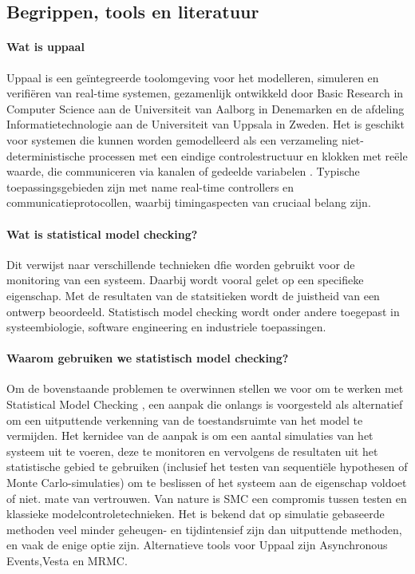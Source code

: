 \documentclass{article}
\begin{document}
	
	\subsection{Begrippen, tools en literatuur}
	
	\paragraph{Wat is uppaal}
	Uppaal is een geïntegreerde toolomgeving voor het modelleren, simuleren en verifiëren van real-time systemen, gezamenlijk ontwikkeld door Basic Research in Computer Science aan de Universiteit van Aalborg in Denemarken en de afdeling Informatietechnologie aan de Universiteit van Uppsala in Zweden. Het is geschikt voor systemen die kunnen worden gemodelleerd als een verzameling niet-deterministische processen met een eindige controlestructuur en klokken met reële waarde, die communiceren via kanalen of gedeelde variabelen . Typische toepassingsgebieden zijn met name real-time controllers en communicatieprotocollen, waarbij timingaspecten van cruciaal belang zijn. %
	
	\paragraph{Wat is statistical model checking?}
	Dit verwijst naar verschillende technieken dfie worden gebruikt voor de monitoring van een systeem. Daarbij wordt vooral gelet op een specifieke eigenschap. Met de resultaten van de statsitieken wordt de juistheid van een ontwerp beoordeeld. Statistisch model checking wordt onder andere toegepast in systeembiologie, software engineering en industriele toepassingen.
	\cite{inriaStatsMoodCheck}
	\cite{ buddeModelChecker}
	
	\paragraph{Waarom gebruiken we statistisch model checking?}
	Om de bovenstaande problemen te overwinnen stellen we voor om te werken met Statistical Model Checking , een aanpak die onlangs is voorgesteld als alternatief om een uitputtende verkenning van de toestandsruimte van het model te vermijden. Het kernidee van de aanpak is om een aantal simulaties van het systeem uit te voeren, deze te monitoren en vervolgens de resultaten uit het statistische gebied te gebruiken (inclusief het testen van sequentiële hypothesen of Monte Carlo-simulaties) om te beslissen of het systeem aan de eigenschap voldoet of niet. mate van vertrouwen. Van nature is SMC een compromis tussen testen en klassieke modelcontroletechnieken. Het is bekend dat op simulatie gebaseerde methoden veel minder geheugen- en tijdintensief zijn dan uitputtende methoden, en vaak de enige optie zijn.
	\cite{inriaStatsMoodCheck}Alternatieve tools voor Uppaal zijn Asynchronous Events,Vesta en MRMC.
	
\end{document}
